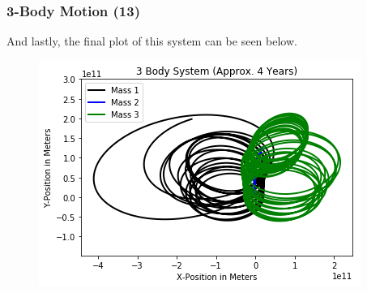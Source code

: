 \documentclass{beamer}
\begin{document}
\begin{frame}
\frametitle{3-Body Motion (13)}
And lastly, the final plot of this system can be seen below.
\begin{figure}
\begin{center}
\includegraphics[width=0.90\linewidth]{3BodyDynamics12.png}
\end{center}
\end{figure}
\end{frame}
\end{document}
